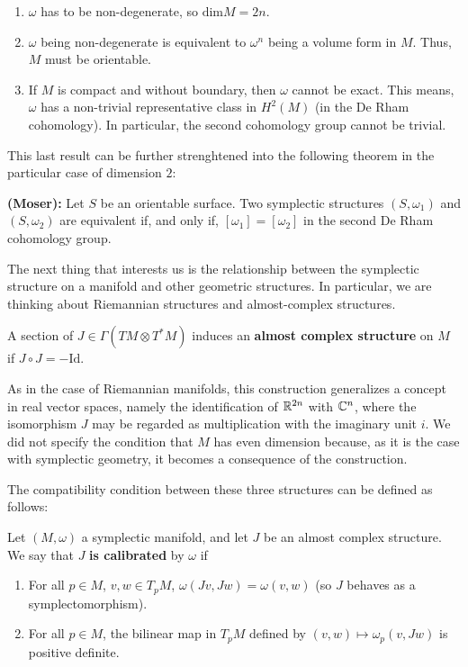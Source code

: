 \begin{enumerate}
	\item $\omega$ has to be non-degenerate, so $\text{dim}M = 2n$.
	\item $\omega$ being non-degenerate is equivalent to $\omega^n$ being a volume form in $M$. Thus, $M$ must be orientable.
	\item If $M$ is compact and without boundary, then $\omega$ cannot be exact. This means, $\omega$ has a non-trivial representative class in $H^2(M)$ (in the De Rham cohomology). In particular, the second cohomology group cannot be trivial.
\end{enumerate}

This last result can be further strenghtened into the following theorem in the particular case of dimension $2$:

\begin{theo}
{\bf (Moser):} Let $S$ be an orientable surface. Two symplectic structures $(S,\omega_1)$ and $(S,\omega_2)$ are equivalent if, and only if, $[\omega_1] = [\omega_2]$ in the second De Rham cohomology group.
\end{theo}

The next thing that interests us is the relationship between the symplectic structure on a manifold and other geometric structures. In particular, we are thinking about Riemannian structures and almost-complex structures.

\begin{deff}
A section of $J \in \Gamma(TM \otimes T^{\ast}M)$ induces an {\bf almost complex structure} on $M$ if $J \circ J = - \text{Id}$.
\end{deff}

As in the case of Riemannian manifolds, this construction generalizes a concept in real vector spaces, namely the identification of $\mathbb{R}^{2n}$ with $\mathbb{C}^n$, where the isomorphism $J$ may be regarded as multiplication with the imaginary unit $i$. We did not specify the condition that $M$ has even dimension because, as it is the case with symplectic geometry, it becomes a consequence of the construction.

The compatibility condition between these three structures can be defined as follows:

\begin{deff} \label{definition:calibrated_almost_complex}
Let $(M,\omega)$ a symplectic manifold, and let $J$ be an almost complex structure. We say that $J$ {\bf is calibrated} by $\omega$ if

\begin{enumerate}
	\item For all $p \in M$, $v,w \in T_pM$, $\omega(Jv,Jw) = \omega(v,w)$ (so $J$ behaves as a symplectomorphism).
	\item For all $p \in M$, the bilinear map in $T_pM$ defined by $(v,w) \mapsto \omega_p(v,Jw)$ is positive definite.
\end{enumerate}
\end{deff}


